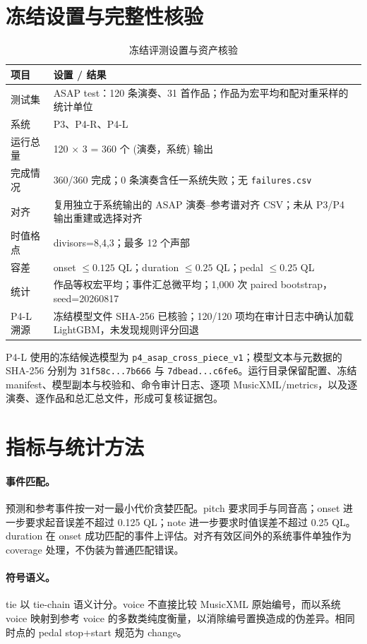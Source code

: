 \documentclass[UTF8,a4paper,11pt]{ctexart}
\begin{document}
\section{冻结设置与完整性核验}
\begin{table}[h]
\centering
\caption{冻结评测设置与资产核验}
\begin{tabularx}{\linewidth}{@{}lX@{}}
\toprule
项目 & 设置 / 结果\\
\midrule
测试集 & ASAP test：120 条演奏、31 首作品；作品为宏平均和配对重采样的统计单位\\
系统 & P3、P4-R、P4-L\\
运行总量 & 120 $\times$ 3 = 360 个 (演奏，系统) 输出\\
完成情况 & 360/360 完成；0 条演奏含任一系统失败；无 \texttt{failures.csv}\\
对齐 & 复用独立于系统输出的 ASAP 演奏--参考谱对齐 CSV；未从 P3/P4 输出重建或选择对齐\\
时值格点 & divisors=8,4,3；最多 12 个声部\\
容差 & onset $\leq0.125$ QL；duration $\leq0.25$ QL；pedal $\leq0.25$ QL\\
统计 & 作品等权宏平均；事件汇总微平均；1,000 次 paired bootstrap，seed=20260817\\
P4-L 溯源 & 冻结模型文件 SHA-256 已核验；120/120 项均在审计日志中确认加载 LightGBM，未发现规则评分回退\\
\bottomrule
\end{tabularx}
\end{table}

P4-L 使用的冻结候选模型为 \texttt{p4\_asap\_cross\_piece\_v1}；模型文本与元数据的 SHA-256 分别为 \texttt{31f58c...7b666} 与 \texttt{7dbead...c6fe6}。运行目录保留配置、冻结 manifest、模型副本与校验和、命令审计日志、逐项 MusicXML/metrics，以及逐演奏、逐作品和总汇总文件，形成可复核证据包。

\section{指标与统计方法}
\paragraph{事件匹配。}预测和参考事件按一对一最小代价贪婪匹配。pitch 要求同手与同音高；onset 进一步要求起音误差不超过 0.125 QL；note 进一步要求时值误差不超过 0.25 QL。duration 在 onset 成功匹配的事件上评估。对齐有效区间外的系统事件单独作为 coverage 处理，不伪装为普通匹配错误。

\paragraph{符号语义。}tie 以 tie-chain 语义计分。voice 不直接比较 MusicXML 原始编号，而以系统 voice 映射到参考 voice 的多数类纯度衡量，以消除编号置换造成的伪差异。相同时点的 pedal stop+start 规范为 change。
\end{document}
